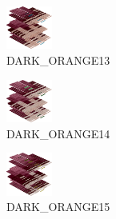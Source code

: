 \hspace{0.1cm}
\begin{minipage}[b]{0.15\linewidth}
\begin{figure}[H]                                                          
  \centering                                                             
  \begin{adjustbox}{width=1.5cm,center}                                   
  \includegraphics[width=1.5cm]{src/colorspace_colourflow/flows/colourflow_61-45.png}%
  \end{adjustbox}                                                        
\caption*{DARK\_ORANGE13}                                           
\end{figure}                                                               
\end{minipage}
\hspace{0.1cm}
\begin{minipage}[b]{0.15\linewidth}
\begin{figure}[H]                                                          
  \centering                                                             
  \begin{adjustbox}{width=1.5cm,center}                                   
  \includegraphics[width=1.5cm]{src/colorspace_colourflow/flows/colourflow_62-45.png}%
  \end{adjustbox}                                                        
\caption*{DARK\_ORANGE14}                                           
\end{figure}                                                               
\end{minipage}
\hspace{0.1cm}
\begin{minipage}[b]{0.15\linewidth}
\begin{figure}[H]                                                          
  \centering                                                             
  \begin{adjustbox}{width=1.5cm,center}                                   
  \includegraphics[width=1.5cm]{src/colorspace_colourflow/flows/colourflow_63-45.png}%
  \end{adjustbox}                                                        
\caption*{DARK\_ORANGE15}                                           
\end{figure}                                                               
\end{minipage}
